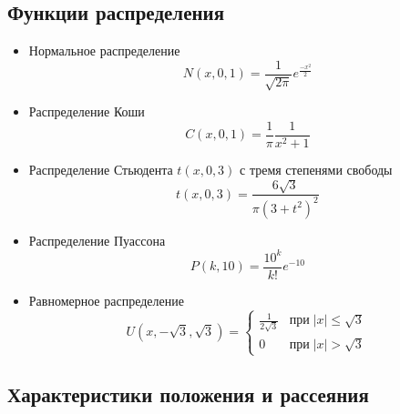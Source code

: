 \documentclass[12pt,a4paper]{article}
\begin{document}
	\subsection{Функции распределения}
	\begin{itemize}
	\item Нормальное распределение
	\begin{equation}
	N(x, 0, 1) = \frac{1}{\sqrt{2\pi}}e^\frac{-x^2}{2}
	\end{equation}

	\item Распределение Коши
	\begin{equation}
	C(x, 0, 1) = \frac{1}{\pi}\frac{1}{x^2+1}
	\end{equation}

	\item Распределение Стьюдента $t(x, 0, 3)$ с тремя степенями свободы
	\begin{equation}
	t(x, 0, 3) = \frac{6\sqrt3}{\pi(3 + t^2)^2}
	\end{equation}

	\item Распределение Пуассона
	\begin{equation}
	P(k, 10) = \frac{10^k}{k!}e^{-10}
	\end{equation}

	\item Равномерное распределение
	\begin{equation}
		U(x, -\sqrt3, \sqrt3) = \begin{cases}
			\frac{1}{2\sqrt3} & \mbox{при} \; |x| \leq \sqrt3\\
			0 & \mbox{при} \; |x| > \sqrt3
		\end{cases}
	\end{equation}

	\end{itemize}

	\subsection{Характеристики положения и рассеяния}
\end{document}
